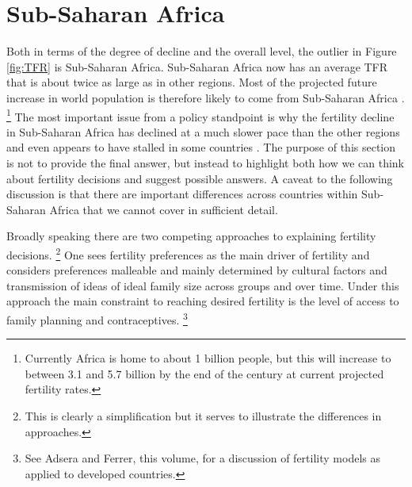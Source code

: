 \documentclass[letterpaper,12pt]{article}
\begin{document}
\section{Sub-Saharan Africa}\label{sub-saharan-africa}

Both in terms of the degree of decline and the overall level, the
outlier in Figure \ref{fig:TFR} is Sub-Saharan Africa. 
Sub-Saharan Africa now has an average TFR that is about twice as large
as in other regions. 
Most of the projected future increase in world population is therefore
likely to come from Sub-Saharan Africa \citep{Gerland2014}.%
\footnote{
Currently Africa is home to about 1 billion people, but this will
increase to between 3.1 and 5.7 billion by the end of the century at
current projected fertility rates.} 
The most important issue from a policy standpoint is why the fertility
decline in Sub-Saharan Africa has declined at a much slower pace than
the other regions and even appears to have stalled in some countries
\citep{Ainsworth1996a,Singh2017}. 
The purpose of this section is not to provide the final answer, but
instead to highlight both how we can think about fertility decisions and
suggest possible answers. 
A caveat to the following discussion is that there are important
differences across countries within Sub-Saharan Africa that we cannot
cover in sufficient detail.

Broadly speaking there are two competing approaches to explaining
fertility decisions.%
\footnote{
This is clearly a simplification but it serves to illustrate the
differences in approaches.} 
One sees fertility preferences as the main driver of fertility and
considers preferences malleable and mainly determined by cultural
factors and transmission of ideas of ideal family size across groups and
over time. 
Under this approach the main constraint to reaching desired fertility is
the level of access to family planning and contraceptives.%
\footnote{
See Adsera and Ferrer, this volume, for a discussion of fertility models
as applied to developed countries.}
\end{document}
